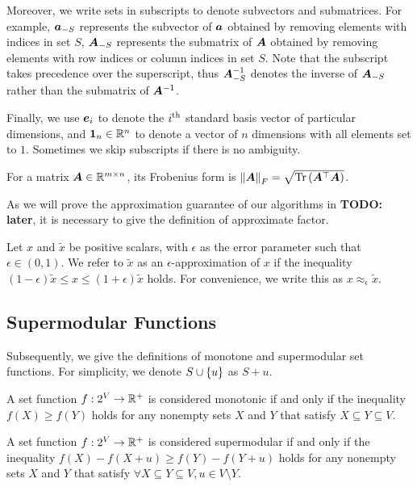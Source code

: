 \documentclass[journal]{IEEEtran}
\newcommand{\todo}[1]{{\bf \color{red} TODO: #1}}
\begin{document}
Moreover, we write sets in subscripts to denote subvectors and submatrices.
For example, \(\boldsymbol{a}_{-S}\) represents the subvector of \(\boldsymbol{a}\) obtained by removing elements with indices in set \(S\), \(\boldsymbol{A}_{-S}\) represents the submatrix of \(\boldsymbol{A}\) obtained by removing elements with row indices or column indices in set \(S\).
Note that the subscript takes precedence over the superscript, thus \(\boldsymbol{A}_{-S}^{-1}\) denotes the inverse of \(\boldsymbol{A}_{-S}\) rather than the submatrix of \(\boldsymbol{A}^{-1}\).

Finally, we use \(\boldsymbol{e}_i\) to denote the \({i}^{\rm{th}}\) standard basis vector of particular dimensions, and \(\boldsymbol{1}_n\in \mathbb{R}^n\) to denote a vector of \(n\) dimensions with all elements set to \(1\).
Sometimes we skip subscripts if there is no ambiguity.

For a matrix \(\boldsymbol{A}\in\mathbb{R}^{m\times n}\), its Frobenius form is \(\left\Vert\boldsymbol{A}\right\Vert_F=\sqrt{\mathrm{Tr}\left(\boldsymbol{A}^\top\boldsymbol{A}\right)}\).

As we will prove the approximation guarantee of our algorithms in \todo{later}, it is necessary to give the definition of approximate factor.

\begin{definition}
    Let \(x\) and \(\tilde{x}\) be positive scalars, with \(\epsilon\) as the error parameter such that \(\epsilon\in(0,1)\). We refer to \(\tilde{x}\) as an \(\epsilon\)-approximation of \(x\) if the inequality \((1-\epsilon)\tilde{x}\le x\le(1+\epsilon)\tilde{x}\) holds. For convenience, we write this as \(x\approx_{\epsilon}\tilde{x}\).
\end{definition}

\subsection{Supermodular Functions}

Subsequently, we give the definitions of monotone and supermodular set functions. For simplicity, we denote \(S\cup\left\{u \right\}\) as \(S+u\).

\begin{definition}[Monotonicity]
    A set function \(f:2^{V}\to\mathbb{R}^+\) is considered monotonic if and only if the inequality \(f(X)\ge f(Y)\) holds for any nonempty sets \(X\) and \(Y\) that satisfy \(X\subseteq Y\subseteq V\).
\end{definition}

\begin{definition}[Supermodularity]
    A set function \(f:2^{V}\to\mathbb{R}^+\) is considered supermodular if and only if the inequality \(f(X)-f(X+u)\ge f(Y)-f(Y+u)\) holds for any nonempty sets \(X\) and \(Y\) that satisfy \(\forall X\subseteq Y\subseteq V, u\in V\setminus Y\).
\end{definition}
\end{document}
